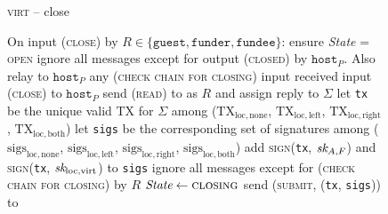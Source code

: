\begin{figure}[H]
  \begin{processbox}{\textsc{virt} -- close}
    \begin{algorithmic}[1]
      \State On input (\textsc{close}) by $R \in \{\texttt{guest},
      \texttt{funder}, \texttt{fundee}\}$: 
      \Indent
        \State ensure \textit{State} = \textsc{open}
         
          \State ignore all messages except for output (\textsc{closed}) by
          $\texttt{host}_P$. Also relay to $\texttt{host}_P$ any (\textsc{check
          chain for closing}) input received
          \State input (\textsc{close}) to $\texttt{host}_P$
        \EndIf
        \State {}
        \State send (\textsc{read}) to \ledger as $R$ and assign reply to
        $\Sigma$
        \State let \texttt{tx} be the unique valid TX for $\Sigma$ among
        ($\mathrm{TX}_{\mathrm{loc}, \mathrm{none}}$,
        $\mathrm{TX}_{\mathrm{loc}, \mathrm{left}}$, $\mathrm{TX}_{\mathrm{loc},
        \mathrm{right}}$, $\mathrm{TX}_{\mathrm{loc}, \mathrm{both}}$)
        \State let \texttt{sigs} be the corresponding set of signatures among
        ($\mathrm{sigs}_{\mathrm{loc}, \mathrm{none}}$,
        $\mathrm{sigs}_{\mathrm{loc}, \mathrm{left}}$,
        $\mathrm{sigs}_{\mathrm{loc}, \mathrm{right}}$,
        $\mathrm{sigs}_{\mathrm{loc}, \mathrm{both}}$)
        \State add \textsc{sign}(\texttt{tx}, $\textit{sk}_{A, F}$) and
        \textsc{sign}(\texttt{tx}, $\textit{sk}_{\mathrm{loc}, \mathrm{virt}}$) to
        \texttt{sigs} 
        \State ignore all messages except for (\textsc{check chain for closing})
        by $R$
        \State $\textit{State} \gets \textsc{closing}$
        \State send (\textsc{submit}, (\texttt{tx}, \texttt{sigs})) to \ledger
      \EndIndent
      \Statex


\end{algorithmic}
\end{processbox}
\end{figure}
